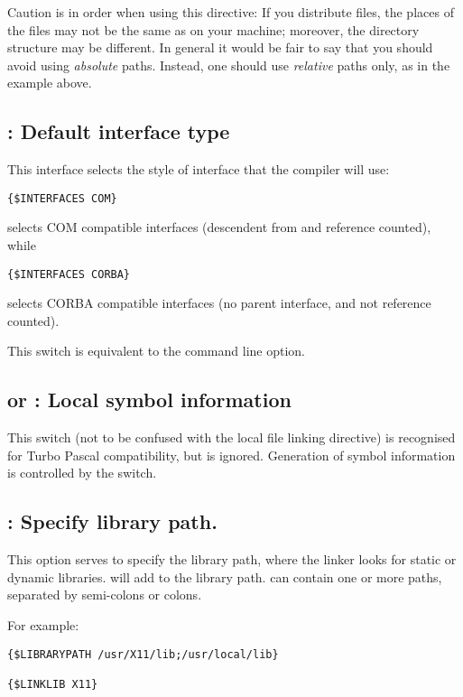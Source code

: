 Caution is in order when using this directive: If you distribute files, the
places of the files may not be the same as on your machine; moreover, the
directory structure may be different. In general it would be fair to say
that you should avoid using {\em absolute} paths. Instead, one should use 
{\em relative} paths only, as in the example above. 

\subsection{ : Default interface type}
This interface selects the style of interface that the compiler will use:
\begin{verbatim}
{$INTERFACES COM}
\end{verbatim}
selects COM compatible interfaces (descendent from  and
reference counted), while
\begin{verbatim}
{$INTERFACES CORBA}
\end{verbatim}
selects CORBA compatible interfaces (no parent interface, and not reference
counted).

This switch is equivalent to the  command line option.

\subsection{ or  : Local symbol information}

This switch (not to be confused with the local  file linking
directive) is recognised for Turbo Pascal compatibility, but is ignored.
Generation of symbol information is controlled by the  switch.

\subsection{ : Specify library path.}

This option serves to specify the library path, where the linker looks for
static or dynamic libraries.  will add 
to the library path.  can contain one or more paths, separated
by semi-colons or colons.

For example:
\begin{verbatim}
{$LIBRARYPATH /usr/X11/lib;/usr/local/lib}

{$LINKLIB X11}
\end{verbatim}


